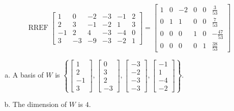 \begin{exerciseAnswer} 


\[\operatorname{RREF} \left[\begin{array}{cccccc}
1 & 0 & -2 & -3 & -1 & 2 \\
2 & 3 & -1 & -2 & 1 & 3 \\
-1 & 2 & 4 & -3 & -4 & 0 \\
3 & -3 & -9 & -3 & -2 & 1
\end{array}\right] = \left[\begin{array}{cccccc}
1 & 0 & -2 & 0 & 0 & \frac{3}{53} \\
0 & 1 & 1 & 0 & 0 & \frac{7}{53} \\
0 & 0 & 0 & 1 & 0 & -\frac{47}{53} \\
0 & 0 & 0 & 0 & 1 & \frac{38}{53}
\end{array}\right] \]


\begin{enumerate}[(a)]
\item A basis of \(W\) is \( \left\{ \left[\begin{array}{c}
1 \\
2 \\
-1 \\
3
\end{array}\right] , \left[\begin{array}{c}
0 \\
3 \\
2 \\
-3
\end{array}\right] , \left[\begin{array}{c}
-3 \\
-2 \\
-3 \\
-3
\end{array}\right] , \left[\begin{array}{c}
-1 \\
1 \\
-4 \\
-2
\end{array}\right] \right\} \).
\item The dimension of \(W\) is \( 4 \).
\end{enumerate}
    
\end{exerciseAnswer}
    
